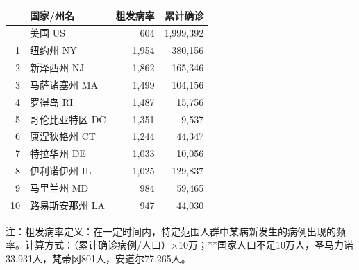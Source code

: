 \documentclass[
]{article}
\begin{document}
\begin{table}[H]
\begin{minipage}{.6\linewidth}
\begin{table}[H]
\begin{tabular}{rlrr}
\toprule
  & 国家/州名 & 粗发病率 & 累计确诊\\
\midrule
\rowcolor{gray!6}   & 美国 US & 604 & 1,999,392\\
1 & 纽约州 NY & 1,954 & 380,156\\
\rowcolor{gray!6}  2 & 新泽西州 NJ & 1,862 & 165,346\\
3 & 马萨诸塞州 MA & 1,499 & 104,156\\
\rowcolor{gray!6}  4 & 罗得岛 RI & 1,487 & 15,756\\
5 & 哥伦比亚特区 DC & 1,351 & 9,537\\
\rowcolor{gray!6}  6 & 康涅狄格州 CT & 1,244 & 44,347\\
7 & 特拉华州 DE & 1,033 & 10,056\\
\rowcolor{gray!6}  8 & 伊利诺伊州 IL & 1,025 & 129,837\\
9 & 马里兰州 MD & 984 & 59,465\\
\rowcolor{gray!6}  10 & 路易斯安那州 LA & 947 & 44,030\\
\bottomrule
\end{tabular}
\endgroup{}
\end{table} \end{minipage} 
    \begin{tablenotes}
        \fontsize{15}{15}
        \selectfont
        \item 注：粗发病率定义：在一定时间内，特定范围人群中某病新发生的病例出现的频率。计算方式：（累计确诊病例/人口）×10万；**国家人口不足10万人，圣马力诺33,931人，梵蒂冈801人，安道尔77,265人。  %
      \end{tablenotes}
\end{table}
\end{document}
